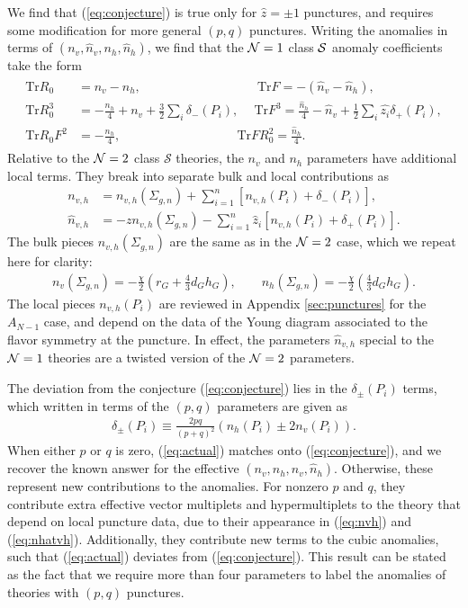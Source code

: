 \documentclass[a4paper,11pt]{article}
\newcommand{\ba}[1]{\begin{align} #1 \end{align} }
\newcommand{\bs}[1]{\begin{split} #1 \end{split} }
\def\tr{\text{Tr}}
\def\CN{{\cal N}}
\def\CS{{\cal S}}
\newcommand{\mc}[1]{\mathcal{ #1} }
\begin{document}
We find that (\ref{eq:conjecture}) is true only for $\hat{z}=\pm 1$ punctures, and requires some modification for more general $(p,q)$ punctures.  Writing the anomalies in terms of  $(n_v,\hat{n}_v,n_h,\hat{n}_h)$, we find that the $\CN=1$ class $\CS$ anomaly coefficients take the form
\ba{\bs{
\tr R_0 &= n_v-n_h,\qquad\qquad\qquad\qquad\quad\  \tr F = -\left( \hat{n}_v-\hat{n}_h\right),\\
\tr R_0^3 &= - \frac{n_h}{4} + n_v + \frac{3}{2} \sum_i\delta_-(P_i),\ \quad\tr F^3 =\frac{\hat{n}_h}{4} - \hat{n}_v + \frac{1}{2}\sum_i\hat{z_i}\delta_+(P_i), \\
\tr R_0F^2&=-\frac{n_h}{4} ,\qquad\qquad\qquad\qquad\quad\   \tr FR_0^2=\frac{\hat{n}_h}{4}.
}\label{eq:actual}}
Relative to the $\CN=2$ class $\mc{S}$ theories, the $n_v$ and $n_h$ parameters have additional local terms. They break into separate bulk and local contributions as
	\ba{
	n_{v,h}&=n_{v,h}(\Sigma_{g,n}) + \sum_{i=1}^n \left[n_{v,h}(P_i)+\delta_-(P_i)\right],\label{eq:nvh}\\
	\hat{n}_{v,h}&=-z n_{v,h}(\Sigma_{g,n}) -\sum_{i=1}^{n} \hat{z}_i \left[n_{v,h}(P_i)+\delta_+(P_i)\right]. \label{eq:nhatvh}
	}
The bulk pieces $n_{v,h}(\Sigma_{g,n})$ are the same as in the $\CN=2$ case, which we repeat here for clarity:
	\ba{
	n_v(\Sigma_{g,n})= -\frac{\chi}{2} \left(r_G + \frac{4}{3}d_Gh_G\right),\qquad n_h(\Sigma_{g,n}) = -\frac{\chi}{2} \left(\frac{4}{3}d_Gh_G\right).
	}
The local pieces $n_{v,h}(P_i)$ are reviewed in Appendix \ref{sec:punctures} for the $A_{N-1}$ case, and depend on the data of the Young diagram associated to the flavor symmetry at the puncture. In effect, the parameters $\hat{n}_{v,h}$ special to the $\CN=1$ theories are a twisted version of the $\CN=2$ parameters.
	
The deviation from the conjecture (\ref{eq:conjecture}) lies in the $\delta_\pm(P_i)$ terms, which written in terms of the $(p,q)$ parameters are given as
	\ba{
	\delta_\pm(P_i) \equiv \frac{2pq}{(p+q)^2}\left(n_h(P_i)\pm 2 n_v(P_i) \right).
	}
When either $p$ or $q$ is zero, (\ref{eq:actual}) matches onto (\ref{eq:conjecture}), and we recover the known answer for the effective $(n_v,n_h,\hat{n}_v,\hat{n}_h)$. Otherwise, these represent new contributions to the anomalies. For nonzero $p$ and $q$, they contribute extra effective vector multiplets and hypermultiplets to the theory that depend on local puncture data, due to their appearance in (\ref{eq:nvh}) and (\ref{eq:nhatvh}). Additionally, they contribute new terms to the cubic anomalies, such that (\ref{eq:actual}) deviates from (\ref{eq:conjecture}). This result can be stated as the fact that we require more than four parameters to label the anomalies of theories with $(p,q)$ punctures.
\end{document}
